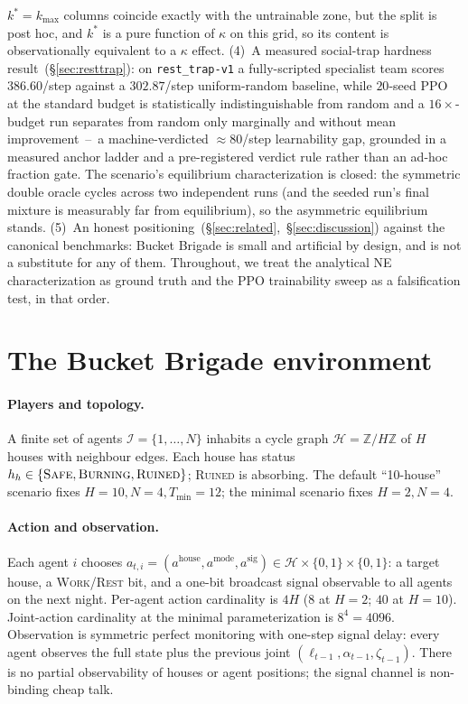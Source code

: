 \documentclass{anvil-paper}
\begin{document}
$k^{*}{=}k_{\max}$ columns coincide exactly with the untrainable zone,
but the split is post hoc, and $k^{*}$ is a pure function of $\kappa$
on this grid, so its content is observationally equivalent to a
$\kappa$ effect.
(4)~A measured social-trap hardness result~(\S\ref{sec:resttrap}): on
\texttt{rest\_trap-v1} a fully-scripted specialist team scores
$386.60$/step against a $302.87$/step uniform-random baseline, while
$20$-seed PPO at the standard budget is statistically indistinguishable
from random and a $16{\times}$-budget run separates from random only
marginally and without mean improvement~--~a machine-verdicted
${\approx}80$/step learnability gap, grounded in a measured anchor
ladder and a pre-registered verdict rule rather than an ad-hoc fraction
gate. The scenario's equilibrium characterization is closed: the
symmetric double oracle cycles across two independent runs (and the
seeded run's final mixture is measurably far from equilibrium), so the
asymmetric equilibrium stands. (5)~An honest
positioning~(\S\ref{sec:related},~\S\ref{sec:discussion}) against the
canonical benchmarks: Bucket Brigade is small and artificial by design,
and is not a substitute for any of them.
Throughout, we treat the analytical NE characterization as ground truth and
the PPO trainability sweep as a falsification test, in that order.

\section{The Bucket Brigade environment}
\label{sec:env}

\paragraph{Players and topology.}
A finite set of agents $\mathcal{I}{=}\{1,\ldots,N\}$ inhabits a cycle graph
$\mathcal{H}{=}\mathbb{Z}/H\mathbb{Z}$ of $H$ houses with neighbour edges. Each
house has status $h_h\in\{\textsc{Safe},\textsc{Burning},\textsc{Ruined}\}$;
\textsc{Ruined} is absorbing. The default ``10-house'' scenario fixes
$H{=}10,N{=}4,T_{\min}{=}12$; the minimal scenario fixes $H{=}2,N{=}4$.

\paragraph{Action and observation.}
Each agent $i$ chooses
$a_{t,i}{=}(a^{\text{house}},a^{\text{mode}},a^{\text{sig}})\in
\mathcal{H}\times\{0,1\}\times\{0,1\}$: a target house, a
\textsc{Work}/\textsc{Rest} bit, and a one-bit broadcast signal observable to
all agents on the next night. Per-agent action cardinality is $4H$ ($8$ at
$H{=}2$; $40$ at $H{=}10$). Joint-action cardinality at the minimal
parameterization is $8^4{=}4096$. Observation is symmetric perfect monitoring
with one-step signal delay: every agent observes the full state plus the
previous joint $(\ell_{t-1},\alpha_{t-1},\zeta_{t-1})$. There is no partial
observability of houses or agent positions; the signal channel is
non-binding cheap talk.
\end{document}

